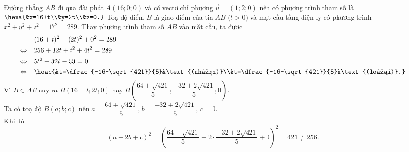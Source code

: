 \begin{ex}
{\begin{itemchoice}
			\itemch Đường thẳng $AB$ đi qua đài phát $A(16;0;0)$ và có vectơ chỉ phương $\overrightarrow{u}=(1;2;0)$ nên có phương trình tham số là $\heva{&x=16+t\\&y=2t\\&z=0.}$
			\itemch Toạ độ điểm $B$ là giao điểm của tia $AB$ ($t>0$) và mặt cầu tầng điện ly có phương trình $x^2+y^2+z^2=17^2=289$.
			Thay phương trình tham số $AB$ vào mặt cầu, ta được
			\begin{align*}
				&(16+t)^2+(2t)^2+0^2=289\\
				\Leftrightarrow \quad &256+32t+t^2+4t^2=289\\
				\Leftrightarrow \quad &5t^2+32t-33=0\\
				\Leftrightarrow \quad &\hoac{&t=\dfrac{-16+\sqrt{421}}{5}&\text{(nhận)}\\&t=\dfrac{-16-\sqrt{421}}{5}&\text{(loại)}.}
			\end{align*}
			Vì $B\in AB$ suy ra $B(16+t;2t;0)$ hay $B\left(\dfrac{64+\sqrt{421}}{5};\dfrac{-32+2\sqrt{421}}{5};0\right)$.\\
			Ta có toạ độ $B(a;b;c)$ nên $a=\dfrac{64+\sqrt{421}}{5}$, $b=\dfrac{-32+2\sqrt{421}}{5}$, $c=0$.\\
			Khi đó
			\[(a+2b+c)^2=\left(\dfrac{64+\sqrt{421}}{5}+2\cdot \dfrac{-32+2\sqrt{421}}{5}+0\right)^2=421\ne 256.\]
\end{itemchoice}}
\end{ex}
